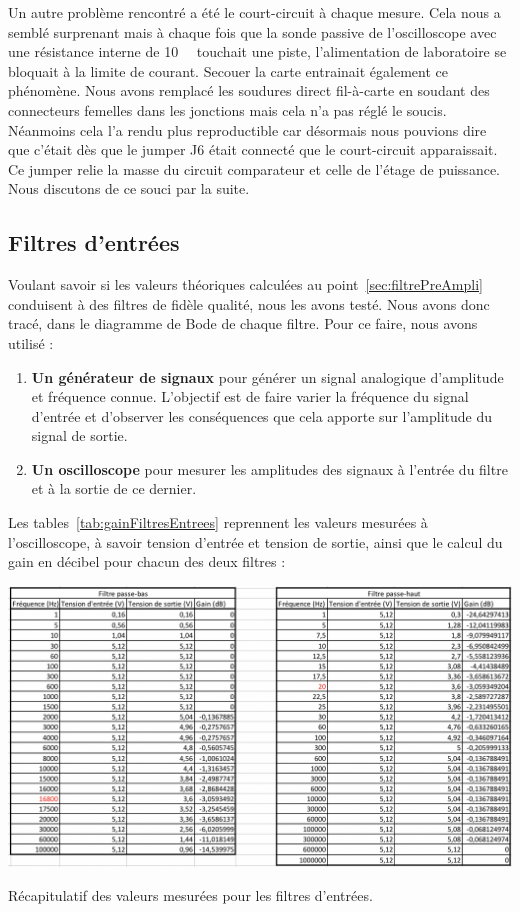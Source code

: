 \documentclass[10pt, oneside, a4paper]{article}
\begin{document}
Un autre problème rencontré a été le court-circuit à chaque mesure.
Cela nous a semblé surprenant mais à chaque fois que la sonde passive de l'oscilloscope avec une résistance interne de \SI{10}{\mega\Omega} touchait une piste, l'alimentation de laboratoire se bloquait à la limite de courant.
Secouer la carte entrainait également ce phénomène.
Nous avons remplacé les soudures direct fil-à-carte en soudant des connecteurs femelles dans les jonctions mais cela n'a pas réglé le soucis.
Néanmoins cela l'a rendu plus reproductible car désormais nous pouvions dire que c'était dès que le jumper J6 était connecté que le court-circuit apparaissait.
Ce jumper relie la masse du circuit comparateur et celle de l'étage de puissance.
Nous discutons de ce souci par la suite.

\subsection{Filtres d'entrées}
Voulant savoir si les valeurs théoriques calculées au point~\ref{sec:filtrePreAmpli}
conduisent à des filtres de fidèle qualité, nous les avons testé.
Nous avons donc tracé, dans le diagramme de Bode de chaque filtre.
Pour ce faire, nous avons utilisé :
\begin{enumerate}
    \item\textbf{Un générateur de signaux} pour générer un signal analogique
        d'amplitude et fréquence connue.
        L'objectif est de faire varier la fréquence du signal d'entrée et d'observer les
        conséquences que cela apporte sur l'amplitude du signal de sortie.
    \item\textbf{Un oscilloscope} pour mesurer les amplitudes des signaux à l'entrée du
        filtre et à la sortie de ce dernier.
\end{enumerate}

Les tables~\ref{tab:gainFiltresEntrees} reprennent les valeurs mesurées à l'oscilloscope, à savoir tension d'entrée et tension de sortie, ainsi que le calcul du gain en décibel pour chacun des deux filtres :
\begin{table}[!ht]
    \centering
    \includegraphics[width=\textwidth]{image/resultat-filtres.jpg}
    \caption{Récapitulatif des valeurs mesurées pour les filtres d'entrées.}
    \label{tab:gainFiltresEntrees}
\end{table}
\end{document}
